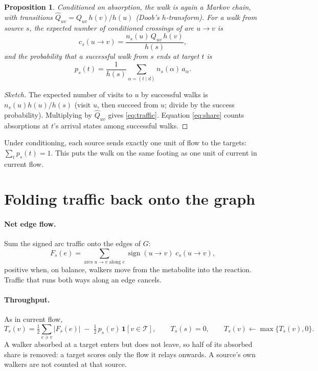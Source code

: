 \documentclass[11pt]{article}
\newcommand{\Tset}{\mathcal{T}}
\newtheorem*{proposition}{Proposition}
\begin{document}
\begin{proposition}
Conditioned on absorption, the walk is again a Markov chain, with transitions
$\widehat Q_{uv} = Q_{uv}\,h(v)/h(u)$ (Doob's $h$-transform). For a walk from source
$s$, the expected number of conditioned crossings of arc $u\to v$ is
\begin{equation}
  c_s(u\to v) = \frac{n_s(u)\,Q_{uv}\,h(v)}{h(s)} ,
  \label{eq:traffic}
\end{equation}
and the probability that a successful walk from $s$ ends at target $t$ is
\begin{equation}
  p_s(t) = \frac{1}{h(s)} \sum_{\alpha=(t\mid d)} n_s(\alpha)\,a_\alpha .
  \label{eq:share}
\end{equation}
\end{proposition}
\begin{proof}[Sketch]
The expected number of visits to $u$ by successful walks is $n_s(u)h(u)/h(s)$ (visit
$u$, then succeed from $u$; divide by the success probability). Multiplying by
$\widehat Q_{uv}$ gives \eqref{eq:traffic}. Equation \eqref{eq:share} counts
absorptions at $t$'s arrival states among successful walks.
\end{proof}
Under conditioning, each source sends exactly one unit of flow to the targets:
$\sum_t p_s(t)=1$. This puts the walk on the same footing as one unit of current in
current flow.

\section{Folding traffic back onto the graph}

\paragraph{Net edge flow.} Sum the signed arc traffic onto the edges of $G$:
\[
  F_s(e) = \sum_{\text{arcs } u\to v \text{ along } e} \operatorname{sign}(u\to v)\;c_s(u\to v),
\]
positive when, on balance, walkers move from the metabolite into the reaction.
Traffic that runs both ways along an edge cancels.

\paragraph{Throughput.} As in current flow,
\begin{equation}
  T_s(v) = \tfrac12 \sum_{e\ni v} |F_s(e)| \;-\; \tfrac12\, p_s(v)\,\mathbf 1[v\in\Tset],
  \qquad T_s(s)=0,\qquad T_s(v)\leftarrow\max\{T_s(v),0\}.
  \label{eq:throughput}
\end{equation}
A walker absorbed at a target enters but does not leave, so half of its absorbed share
is removed: a target scores only the flow it relays onwards. A source's own walkers
are not counted at that source.
\end{document}

